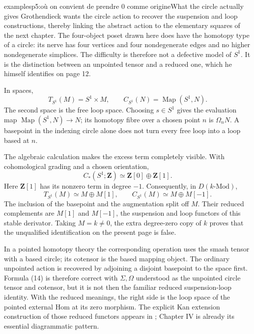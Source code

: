 \begin{dcomment}{examples}{p5:où on convient de prendre 0 comme origine}{What the circle actually gives}
Grothendieck wants the circle action to recover the suspension and loop constructions, thereby linking the abstract action to the elementary squares of the next chapter. The four-object poset drawn here does have the homotopy type of a circle: its nerve has four vertices and four nondegenerate edges and no higher nondegenerate simplices. The difficulty is therefore not a defective model of \(S^1\). It is the distinction between an unpointed tensor and a reduced one, which he himself identifies on page 12.

In spaces,
\[
 T_{S^1}(M)=S^1\times M,\qquad
 C_{S^1}(N)=\operatorname{Map}(S^1,N).
\]
The second space is the free loop space. Choosing \(s\in S^1\) gives the evaluation map \(\operatorname{Map}(S^1,N)\to N\); its homotopy fibre over a chosen point \(n\) is \(\Omega_nN\). A basepoint in the indexing circle alone does not turn every free loop into a loop based at \(n\).

The algebraic calculation makes the excess term completely visible. With cohomological grading and a chosen orientation,
\[
 C_*(S^1;\mathbf Z)\simeq\mathbf Z[0]\oplus\mathbf Z[1].
\]
Here \(\mathbf Z[1]\) has its nonzero term in degree \(-1\). Consequently, in \(D(k\text{-Mod})\),
\[
 T_{S^1}(M)\simeq M\oplus M[1],
 \qquad C_{S^1}(M)\simeq M\oplus M[-1].
\]
The inclusion of the basepoint and the augmentation split off \(M\). Their reduced complements are \(M[1]\) and \(M[-1]\), the suspension and loop functors of this stable derivator. Taking \(M=k\ne0\), the extra degree-zero copy of \(k\) proves that the unqualified identification on the present page is false.

In a pointed homotopy theory the corresponding operation uses the smash tensor with a based circle; its cotensor is the based mapping object. The ordinary unpointed action is recovered by adjoining a disjoint basepoint to the space first. Formula (14) is therefore correct with \(\Sigma,\Omega\) understood as the unpointed circle tensor and cotensor, but it is not then the familiar reduced suspension-loop identity. With the reduced meanings, the right side is the loop space of the pointed external Hom at its zero morphism. The explicit Kan extension construction of those reduced functors appears in \citet[Definition 3.16 and Proposition 3.17]{Groth2013}; Chapter IV is already its essential diagrammatic pattern.
\end{dcomment}


